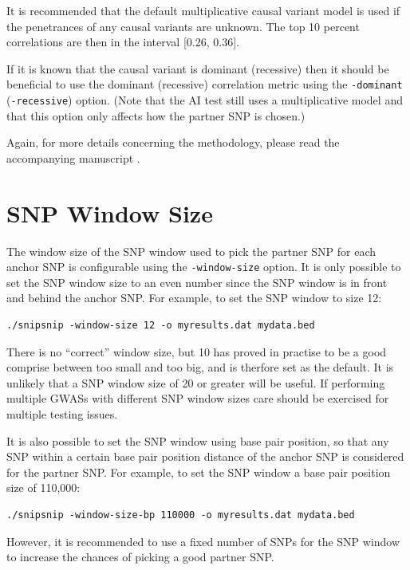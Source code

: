 \documentclass[a4paper,12pt]{article}
\newcommand{\code}[1]{{\footnotesize{{\tt #1}}}}
\begin{document}
It is recommended that the default multiplicative causal variant model is used if the penetrances of any causal variants are unknown. The top 10 percent correlations are then in the interval [0.26, 0.36]. 

If it is known that the causal variant is dominant (recessive) then it should be beneficial to use the dominant (recessive) correlation metric using the \code{-dominant} (\code{-recessive}) option. (Note that the AI test still uses a multiplicative model and that this option only affects how the partner SNP is chosen.) 

Again, for more details concerning the methodology, please read the accompanying manuscript \citet{howey:etal:14}. 


\section{SNP Window Size}
\label{windowsize}

The window size of the SNP window used to pick the partner SNP for each anchor SNP is configurable using the \code{-window-size} option. It is only possible to set the SNP window size to an even number since the SNP window is in front and behind the anchor SNP. For example, to set the SNP window to size 12: 
\begin{verbatim}
./snipsnip -window-size 12 -o myresults.dat mydata.bed
\end{verbatim}

There is no ``correct'' window size, but 10 has proved in practise to be a good comprise between too small and too big, and is therfore set as the default. It is unlikely that a SNP window size of 20 or greater will be useful. If performing multiple GWASs with different SNP window sizes care should be exercised for multiple testing issues. 

It is also possible to set the SNP window using base pair position, so that any SNP within a certain base pair position distance of the anchor SNP is considered for the partner SNP. For example, to set the SNP window a base pair position size of 110,000: 
\begin{verbatim}
./snipsnip -window-size-bp 110000 -o myresults.dat mydata.bed
\end{verbatim}

However, it is recommended to use a fixed number of SNPs for the SNP window to increase the chances of picking a good partner SNP. 
\end{document}
